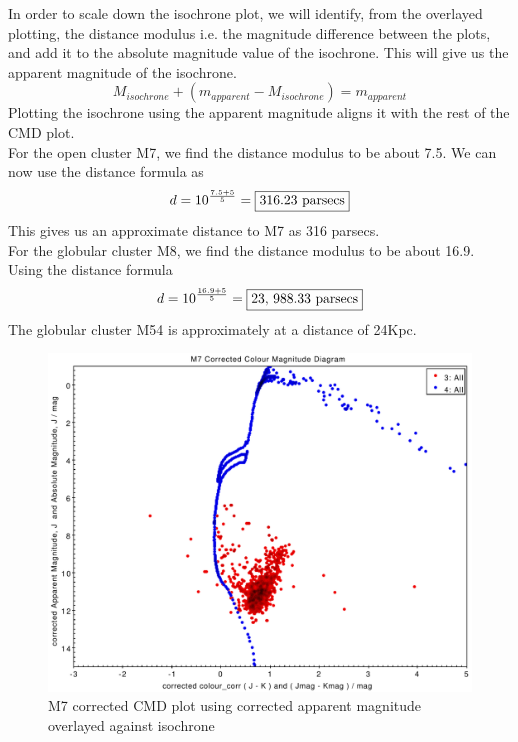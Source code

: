 \documentclass[12pt, twocolumn]{aastex62}
\begin{document}
		In order to scale down the isochrone plot, we will identify, from the overlayed plotting, the distance modulus i.e. the magnitude difference between the plots, and add it to the absolute magnitude value of the isochrone. This will give us the apparent magnitude of the isochrone.\[M_{isochrone} + (m_{apparent} - M_{isochrone}) = m_{apparent}\]
		Plotting the isochrone using the apparent magnitude aligns it with the rest of the CMD plot.\\
		For the open cluster M7, we find the distance modulus to be about 7.5. We can now use the distance formula as
		\[d = 10^{\frac{7.5 + 5}{5}} = \framebox{316.23 parsecs}\]
		This gives us an approximate distance to M7 as 316 parsecs.\\
		For the globular cluster M8, we find the distance modulus to be about 16.9. Using the distance formula
		\[d = 10^{\frac{16.9 + 5}{5}} = \framebox{23, 988.33 parsecs}\]
		The globular cluster M54 is approximately at a distance of 24Kpc.
		\begin{figure}
			\includegraphics[scale=0.34]{m7_cmd_all}
			\caption{M7 corrected CMD plot using corrected apparent magnitude overlayed against isochrone}
			\label{fig: m7_cmd_all}
		\end{figure}
\end{document}
